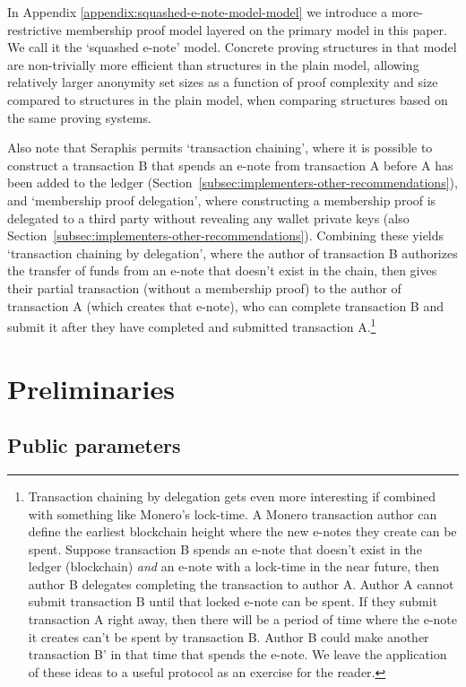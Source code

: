 In Appendix \ref{appendix:squashed-e-note-model-model} we introduce a more-restrictive membership proof model layered on the primary model in this paper. We call it the `squashed e-note' model. Concrete proving structures in that model are non-trivially more efficient than structures in the plain model, allowing relatively larger anonymity set sizes as a function of proof complexity and size compared to structures in the plain model, when comparing structures based on the same proving systems.

Also note that Seraphis permits `transaction chaining', where it is possible to construct a transaction B that spends an e-note from transaction A before A has been added to the ledger (Section~\ref{subsec:implementers-other-recommendations}), and `membership proof delegation', where constructing a membership proof is delegated to a third party without revealing any wallet private keys (also Section~\ref{subsec:implementers-other-recommendations}). Combining these yields `transaction chaining by delegation', where the author of transaction B authorizes the transfer of funds from an e-note that doesn't exist in the chain, then gives their partial transaction (without a membership proof) to the author of transaction A (which creates that e-note), who can complete transaction B and submit it after they have completed and submitted transaction A.\footnote{Transaction chaining by delegation gets even more interesting if combined with something like Monero's lock-time. A Monero transaction author can define the earliest blockchain height where the new e-notes they create can be spent. Suppose transaction B spends an e-note that doesn't exist in the ledger (blockchain) {\em and} an e-note with a lock-time in the near future, then author B delegates completing the transaction to author A. Author A cannot submit transaction B until that locked e-note can be spent. If they submit transaction A right away, then there will be a period of time where the e-note it creates can't be spent by transaction B. Author B could make another transaction B' in that time that spends the e-note. We leave the application of these ideas to a useful protocol as an exercise for the reader.}



\section{Preliminaries}
\label{sec:preliminaries}

\subsection{Public parameters}
\label{subsec:preliminaries-public-parameters}

